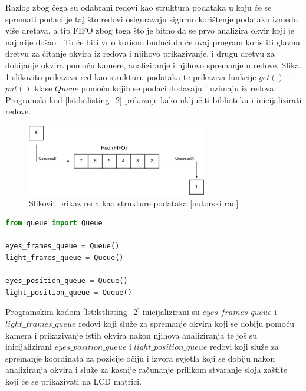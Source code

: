 \documentclass{foi}
\begin{document}
Razlog zbog čega su odabrani redovi kao struktura podataka u koju će se spremati podaci je taj što redovi osiguravaju sigurno korištenje podataka između više dretava, a tip FIFO zbog toga što je bitno da se prvo analizira okvir koji je najprije došao \cite{PythonSoftwareFoundation}. To će biti vrlo korisno budući da će ovaj program koristiti glavnu dretvu za čitanje okvira iz redova i njihovo prikazivanje, i drugu dretvu za dobijanje okvira pomoću kamere, analiziranje i njihovo spremanje u redove. Slika \ref{fig:dijagram_red} slikovito prikaziva red kao strukturu podataka te prikaziva funkcije $get()$ i $put()$ klase $Queue$ pomoću kojih se podaci dodavaju i uzimaju iz redova. Programski kod \ref{lst:lstlisting_2} prikazuje kako uključiti biblioteku i inicijalizirati redove.

\begin{figure}[h!]
    \centering
    \includegraphics[width=0.7\textwidth]{slike/redovi_dijagram}
    \caption{Slikovit prikaz reda kao strukture podataka [autorski rad]}
    \label{fig:dijagram_red}
\end{figure}

\begin{lstlisting}[language=Python, label={lst:lstlisting_2}, firstnumber=4, style=colored, caption=Uključivanje biblioteke $queue$ i inicijaliziranje redova]
from queue import Queue

eyes_frames_queue = Queue()
light_frames_queue = Queue()

eyes_position_queue = Queue()
light_position_queue = Queue()
\end{lstlisting}

Programskim kodom \ref{lst:lstlisting_2} inicijalizirani su  $eyes\_frames\_queue$ i $light\_frames\_queue$ redovi koji služe za spremanje okvira koji se dobiju pomoću kamera i prikazivanje istih okvira nakon njihova analiziranja te još su inicijalizirani $eyes\_position\_queue$ i $light\_position\_queue$ redovi koji služe za spremanje koordinata za pozicije očiju i izvora svjetla koji se dobiju nakon analiziranja okvira i služe za kasnije računanje prilikom stvaranje sloja zaštite koji će se prikazivati na LCD matrici.
\end{document}
